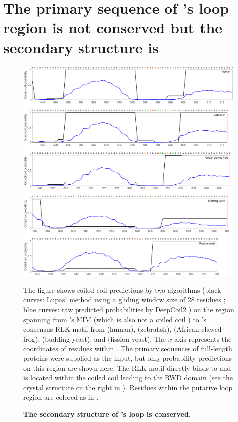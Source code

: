 \section{The primary sequence of 's loop region is not conserved but the secondary structure is}

\begin{figure}
    \centering
    \includegraphics[width=\textwidth]{chapters/figures/MAD1_MIM-RLK_Lupas+DeepCoil2.pdf}
    \caption{\textbf{The secondary structure of 's loop is conserved.}}
    \noindent\justifying The figure shows coiled coil predictions by two algorithms (black curves: Lupas' method using a gliding window size of 28 residues \cite{LupasCOILS}; blue curves: raw predicted probabilities by DeepCoil2 \cite{DeepCoil}) on the region spanning from 's MIM (which is also not a coiled coil \cite{Structure1GO4}) to 's consensus RLK motif from  (human),  (zebrafish),  (African clawed frog),  (budding yeast), and  (fission yeast). The $x$-axis represents the coordinates of residues within . The primary sequences of full-length  proteins were supplied as the input, but only probability predictions on this region are shown here. The RLK motif directly binds to  \cite{Ji2017eLife, MAD1CStructure} and is located within the coiled coil leading to the RWD domain (see the crystal structure on the right in ). Residues within the putative loop region are colored as in .
    \label{MAD1_MIM-RLK_Lupas+DeepCoil2}
\end{figure}

